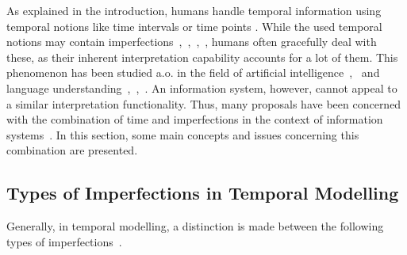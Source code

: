 %
%
As explained in the introduction, humans handle temporal information using temporal notions like time intervals or time points \cite{Dyreson1994}. While the used temporal notions may contain imperfections~\cite{Dev98},~\cite{Dubois:jucs_9_9:fuzziness_and_uncertainty_in},~\cite{nagypal2003},~\cite{Dubois89}, humans often gracefully deal with these, as their inherent interpretation capability accounts for a lot of them. This phenomenon has been studied a.o. in the field of artificial intelligence~\cite{Tre97},~\cite{5151} and language understanding~\cite{DeCaluwe:1997:FTI:285506.285516},~\cite{nagypal2003},~\cite{Dev98}. An information system, however, cannot appeal to a similar interpretation functionality. Thus, many proposals have been concerned with the combination of time and imperfections in the context of information systems~\cite{nagypal2003}. In this section, some main concepts and issues concerning this combination are presented.






\subsection{Types of Imperfections in Temporal Modelling}
Generally, in temporal modelling, a distinction is made between the following types of imperfections~\cite{nagypal2003}.


